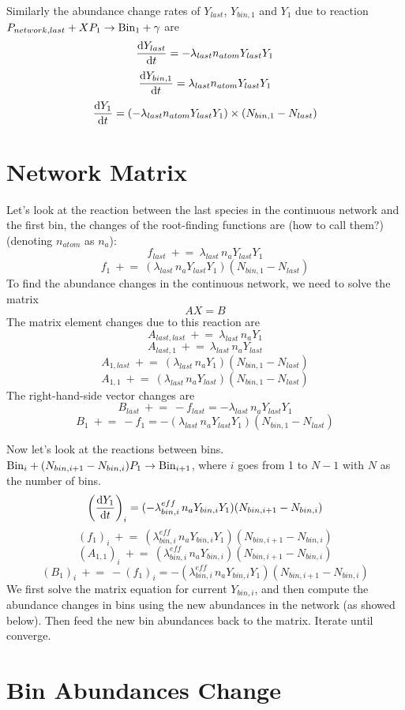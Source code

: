 \documentclass{article}
\begin{document}
Similarly the abundance change rates of $Y_{last}$, $Y_{bin,1}$ and 
$Y_1$ due to reaction $P_{network,last} + X P_1 \to {\rm Bin}_1 + \gamma$ are
\[
\frac{{\rm d}Y_{last}}{{\rm d}t} =
  -\lambda_{last} n_{atom} Y_{last} Y_1
\]
\[
\frac{{\rm d}Y_{bin,1}}{{\rm d}t} =
  \lambda_{last} n_{atom} Y_{last} Y_1
\]
\[
\frac{{\rm d}Y_1}{{\rm d}t} =
  (-\lambda_{last} n_{atom} Y_{last} Y_1) \times
  (N_{bin,1} - N_{last})
\]

\section{Network Matrix}
Let's look at the reaction between the last species in the continuous network
and the first bin, 
the changes of the root-finding functions are (how to call them?)
(denoting $n_{atom}$ as $n_a$):
\[
f_{last} \: +\!\!= \: \lambda_{last} \, n_a Y_{last} Y_1
\]
\[
f_{1} \: +\!\!= \: (\lambda_{last} \, n_a Y_{last} Y_1) 
  (N_{bin,1} - N_{last})
\]
To find the abundance changes in the continuous network, we need to solve the
matrix
\[
AX=B
\]
The matrix element changes due to this reaction are
\[
A_{last,last} \: +\!\!= \: \lambda_{last} \, n_a Y_1
\]
\[
A_{last,1} \: +\!\!= \: \lambda_{last} \, n_a Y_{last}
\]
\[
A_{1,last} \: +\!\!= \: (\lambda_{last} \, n_a Y_1)(N_{bin,1} - N_{last})
\]
\[
A_{1,1} \: +\!\!= \: (\lambda_{last} \, n_a Y_{last})(N_{bin,1} - N_{last})
\]
The right-hand-side vector changes are
\[
B_{last} \: +\!\!= \: -f_{last} = -\lambda_{last} \, n_a Y_{last} Y_1 
\]
\[
B_1 \:+\!\!=\: -f_1 = -(\lambda_{last}\,n_a Y_{last} Y_1)(N_{bin,1}-N_{last})
\]

Now let's look at the reactions between bins. 
${\rm Bin}_i + (N_{bin,i+1}-N_{bin,i})P_1 \to {\rm Bin}_{i+1}$,
where $i$ goes from 1 to $N-1$ with $N$ as the number of bins.
\[
\left( \frac{{\rm d}Y_1}{{\rm d}t}\right) _i =
  ( -\lambda^{eff}_{bin,i} \, n_a Y_{bin,i} Y_1 )(N_{bin,i+1} - N_{bin,i})
\]
\[
(f_{1})_i \: +\!\!= \: 
  (\lambda^{eff}_{bin,i} \, n_a Y_{bin,i} Y_1) (N_{bin,i+1} - N_{bin,i})
\]
\[
(A_{1,1})_i \: +\!\!= \: 
  (\lambda^{eff}_{bin,i} \, n_a Y_{bin,i}) (N_{bin,i+1} - N_{bin,i})
\]
\[
(B_1)_i \:+\!\!=\: -(f_1)_i = 
  -(\lambda^{eff}_{bin,i} \, n_a Y_{bin,i} Y_1) (N_{bin,i+1} - N_{bin,i})
\]
We first solve the matrix equation for current $Y_{bin,i}$, and then compute
the abundance changes in bins using the new abundances in the network 
(as showed below).
Then feed the new bin abundances back to the matrix. Iterate until converge. 

\section{Bin Abundances Change}
\end{document}
